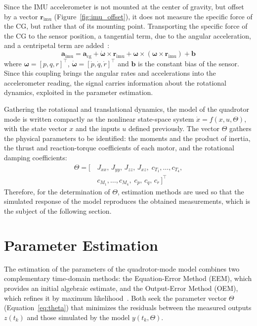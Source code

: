 \documentclass{ieeeaccess}
\begin{document}
Since the IMU accelerometer is not mounted at the center of gravity, but offset by a vector $\mathbf{r}_{\mathrm{imu}}$ (Figure~\ref{fig:imu_offset}), it does not measure the specific force of the CG, but rather that of its mounting point. Transporting the specific force of the CG to the sensor position, a tangential term, due to the angular acceleration, and a centripetal term are added~\cite{c3}:
\begin{equation}
\mathbf{a}_{\mathrm{imu}} = \mathbf{a}_{\mathrm{cg}} + \dot{\boldsymbol{\omega}} \times \mathbf{r}_{\mathrm{imu}} + \boldsymbol{\omega} \times (\boldsymbol{\omega} \times \mathbf{r}_{\mathrm{imu}}) + \mathbf{b}
\label{eq:acc-imu}
\end{equation}
where $\boldsymbol{\omega} = [p, q, r]^{\top}$, $\dot{\boldsymbol{\omega}} = [\dot{p}, \dot{q}, \dot{r}]^{\top}$ and $\mathbf{b}$ is the constant bias of the sensor. Since this coupling brings the angular rates and accelerations into the accelerometer reading, the signal carries information about the rotational dynamics, exploited in the parameter estimation.

Gathering the rotational and translational dynamics, the model of the quadrotor mode is written compactly as the nonlinear state-space system $\dot{x} = f(x, u, \Theta)$, with the state vector $x$ and the inputs $u$ defined previously. The vector $\Theta$ gathers the physical parameters to be identified: the moments and the product of inertia, the thrust and reaction-torque coefficients of each motor, and the rotational damping coefficients:
\begin{equation}
\begin{aligned}
\Theta = [\,&J_{xx},\,J_{yy},\,J_{zz},\,J_{xz},\;c_{T_1},\dots,c_{T_4},\\
&c_{M_1},\dots,c_{M_4},\;c_p,\,c_q,\,c_r\,]^{\top}
\end{aligned}
\label{eq:theta}
\end{equation}
Therefore, for the determination of $\Theta$, estimation methods are used so that the simulated response of the model reproduces the obtained measurements, which is the subject of the following section.

\section{Parameter Estimation}
\label{sec:estimacao}

The estimation of the parameters of the quadrotor-mode model combines two complementary time-domain methods: the Equation-Error Method (EEM), which provides an initial algebraic estimate, and the Output-Error Method (OEM), which refines it by maximum likelihood~\cite{c2}. Both seek the parameter vector $\Theta$ (Equation~\eqref{eq:theta}) that minimizes the residuals between the measured outputs $z(t_k)$ and those simulated by the model $y(t_k,\Theta)$.
\end{document}
